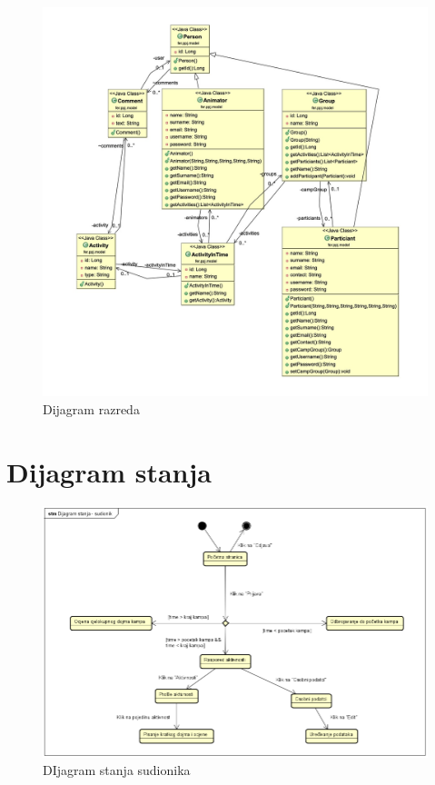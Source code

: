 \begin{figure}[H]
	\includegraphics[scale=0.35]{dijagrami/dijagramRazreda.jpeg} %
	\centering
	\caption{Dijagram razreda}
	\label{fig:promjene}
\end{figure}





\eject

\section{Dijagram stanja}

\begin{figure}[H]
	\includegraphics[scale=0.9]{dokumentacija/dijagrami/state-sudionik.PNG} 
	\centering
	\caption{DIjagram stanja sudionika}
	\label{fig:promjene}
\end{figure}

